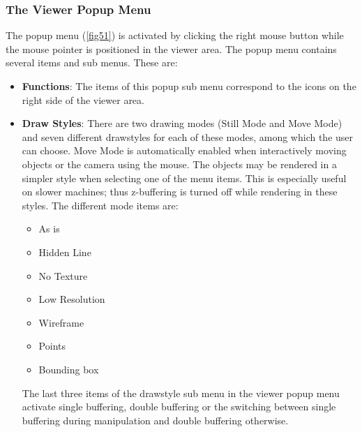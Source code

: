 \subsubsection{The Viewer Popup Menu}

The popup menu (\ref{fig51}) is activated by clicking the right mouse button while
the mouse pointer is positioned in the viewer area. The popup menu contains
several items and sub menus. These are:

\begin{itemize}
\item {\bf Functions}: The items of this popup sub menu correspond to the icons
on the right side of the viewer area.

\item {\bf Draw Styles}: There are two drawing modes (Still Mode and Move Mode) and seven different drawstyles
for each of these modes, among which the user can choose.   Move Mode is
automatically enabled when interactively moving objects or the camera
using the mouse. The objects may be rendered in a simpler style when
selecting one of the menu items. This is especially useful on slower
machines; thus z-buffering is turned off while rendering in these styles.
The different mode items are:

\begin{itemize}
\item As is
\item Hidden Line
\item No Texture
\item Low Resolution
\item Wireframe
\item Points
\item Bounding box
\end{itemize}

The last three items of the drawstyle sub menu in the viewer popup menu activate
single buffering, double buffering or the switching between single buffering
during manipulation and double buffering otherwise.



\end{itemize}
